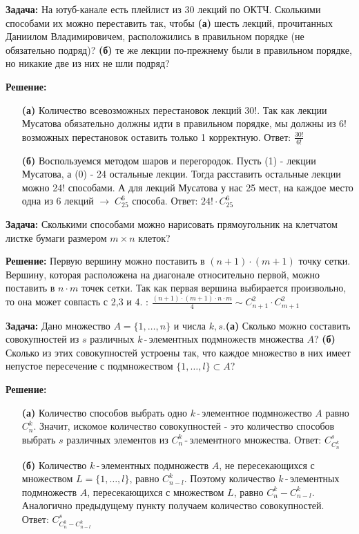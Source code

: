 \textbf{Задача:} На ютуб-канале есть плейлист из 30 лекций по ОКТЧ. Сколькими способами их можно переставить так, чтобы \textbf{(а)} шесть лекций, прочитанных Даниилом Владимировичем, расположились в правильном порядке (не обязательно подряд)? \textbf{(б)} те же лекции по-прежнему были в правильном порядке, но никакие две из них не шли подряд?
\par \textbf{Решение:}
\begin{itemize}
    \item[\textbf{(а)}] Количество всевозможных перестановок лекций 30!. Так как лекции Мусатова обязательно должны идти в правильном порядке, мы должны из 6! возможных перестановок оставить только 1 корректную. 
    \newline Ответ: $\frac{30!}{6!}$
    \item[\textbf{(б)}] Воспользуемся методом шаров и перегородок. Пусть (1) - лекции Мусатова, а (0) - 24 остальные лекции. Тогда расставить остальные лекции можно 24! способами. А для лекций Мусатова у нас 25 мест, на каждое место одна из 6 лекций $\to \; {C}_{25}^6$ способа.
    \newline Ответ: $24! \cdot {C}_{25}^6$
\end{itemize}

\par \textbf{Задача:} Сколькими способами можно нарисовать прямоугольник на клетчатом листке бумаги размером $m\times n$ клеток?
\par \textbf{Решение:} Первую вершину можно поставить в $(n+1)\cdot(m+1)$ точку сетки. Вершину, которая расположена на диагонале относительно первой, можно поставить в $n\cdot m$ точек сетки. Так как первая вершина выбирается произвольно, то она может совпасть с 2,3 и 4. : $\frac{(n+1)\cdot(m+1)\cdot n\cdot m}{4} \sim {C}_{n+1}^2\cdot {C}_{m+1}^2$
\\ \par \textbf{Задача:} Дано множество $A=\{1,\ldots,n\}$ и числа $k, s$.\textbf{(а)} Сколько можно составить совокупностей из $s$ различных $k$\,-\,элементных подмножеств множества $A$? \textbf{(б)} Сколько из этих совокупностей устроены так, что каждое множество в них имеет непустое пересечение с подмножеством $\{1,\ldots,l\} \subset A$?
\par \textbf{Решение:}
\begin{itemize}
    \item[\textbf{(а)}] Количество способов выбрать одно $k$\,-\,элементное подмножество $A$ равно ${C}_n^k$. Значит, искомое количество совокупностей - это количество способов выбрать $s$ различных элементов из ${C}_n^k$\,-\,элементного множества. 
    \newline Ответ: ${C}_{{C}_n^k}^s$
    \item[\textbf{(б)}] Количество $k$\,-\,элементных подмножеств $A$, не пересекающихся с множеством $L=\{1,\ldots,l\}$, равно ${C}_{n-l}^k$. Поэтому количество $k$\,-\,элементных подмножеств $A$, пересекающихся с множеством $L$, равно ${C}_{n}^k-{C}_{n-l}^k$. Аналогично предыдущему пункту получаем количество совокупностей.
    \newline Ответ: ${C}_{{C}_{n}^k-{C}_{n-l}^k}^s$
\end{itemize}

